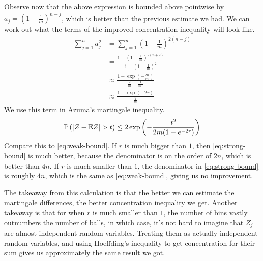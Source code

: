 \documentclass[11pt]{article}
\begin{document}
Observe now that the above expression is bounded above pointwise by $a_j = \left( 1- \frac{1}{m} \right)^{n-j}$, which is better than the previous estimate we had.
We can work out what the terms of the improved concentration inequality will look like.
\begin{align*}
  \sum_{j=1}^{n} a_j^2 &= \sum_{j=1}^n \left( 1 - \frac{1}{m} \right)^{2(n-j)} \\
                       &=\frac{1 - \left( 1- \frac{1}{m} \right)^{2(n+2)}}{1- \left( 1 - \frac{1}{m} \right)^2} \\
                       &\approx \frac{ 1 - \exp\left( - \frac{2n}{m} \right)}{\frac{2}{m} - \frac{1}{m^2}} \\
  &\approx \frac{1 - \exp(-2r)}{\frac{2}{m}}
\end{align*}
We use this term in Azuma's martingale inequality.
\begin{align}
  \label{eq:strong-bound}
  \mathbb{P}\left( \left| Z - \mathbb{E} Z \right| > t \right) \leq 2 \exp \left( - \frac{t^2}{2m(1-e^{-2r})} \right)
\end{align}
Compare this to \eqref{eq:weak-bound}.
If $r$ is much bigger than $1$, then \eqref{eq:strong-bound} is much better, because the denominator is on the order of $2n$, which is better than $4n$.
If $r$ is much smaller than $1$, the denominator in \eqref{eq:strong-bound} is roughly $4n$, which is the same as \eqref{eq:weak-bound}, giving us no improvement.

The takeaway from this calculation is that the better we can estimate the martingale differences, the better concentration inequality we get.
Another takeaway is that for when $r$ is much smaller than $1$, the number of bins vastly outnumbers the number of balls, in which case, it's not hard to imagine that $Z_j$ are almost independent random variables.
Treating them as actually independent random variables, and using Hoeffding's inequality to get concentration for their sum gives us approximately the same result we got.


\printbibliography
\end{document}
